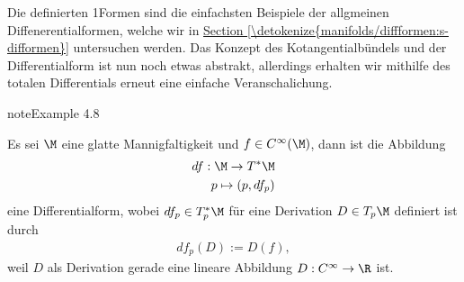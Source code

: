 \documentclass[letterpaper,10pt,english]{jupyterBook}
\begin{document}
\sphinxAtStartPar
Die definierten 1\sphinxhyphen{}Formen sind die einfachsten Beispiele der allgmeinen Diffenerentialformen, welche wir in \hyperref[\detokenize{manifolds/diffformen:s-difformen}]{Section \ref{\detokenize{manifolds/diffformen:s-difformen}}} untersuchen werden. Das Konzept des Kotangentialbündels und der Differentialform ist nun noch etwas abstrakt, allerdings erhalten wir mithilfe des totalen Differentials {\hyperref[\detokenize{manifolds/tangential:def:totdiff}]{}} erneut eine einfache Veranschalichung.
\label{manifolds/tangential:ex:totdiff}
\begin{sphinxadmonition}{note}{Example 4.8}



\sphinxAtStartPar
Es sei \(\M\) eine glatte Mannigfaltigkeit und \(f\in C^\infty(\M)\), dann ist die Abbildung
\begin{equation*}
\begin{split}df:\M\to T^\ast\M\\
p\mapsto (p, df_p)\end{split}
\end{equation*}
\sphinxAtStartPar
eine Differentialform, wobei \(df_p\in T_p^\ast\M\) für eine Derivation \(D\in T_p\M\) definiert ist durch
\begin{equation*}
\begin{split}df_p(D) := D(f),\end{split}
\end{equation*}
\sphinxAtStartPar
weil \(D\) als Derivation gerade eine lineare Abbildung \(D:C^\infty\to\R\) ist.


\end{sphinxadmonition}
\end{document}

